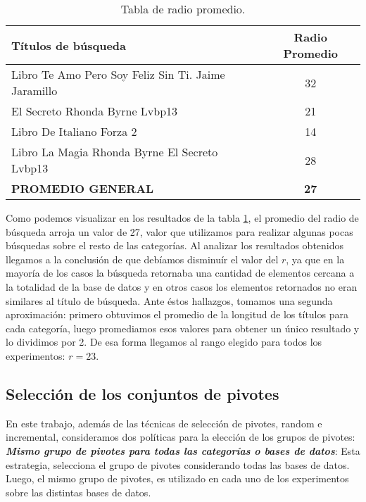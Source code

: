 \begin{table}[H]
\begin{center}
\begin{tabular}{|l|c|}
\hline 
\small T\'itulos de b\'usqueda
&
\small Radio Promedio\\
\hline \hline
\small Libro Te Amo Pero Soy Feliz Sin Ti. Jaime Jaramillo & 32  \\ \hline
\small El Secreto Rhonda Byrne Lvbp13 & 21  \\ \hline
\small Libro De Italiano Forza 2 & 14  \\ \hline
\small Libro La Magia Rhonda Byrne El Secreto Lvbp13 & 28  \\ \hline  \hline
\hspace{4cm}  \textbf{\small PROMEDIO GENERAL} & \textbf{27} \\ \hline
\end{tabular}
\caption{\small Tabla de radio promedio.}
\label{tabla:promedios-rank}
\end{center}
\end{table}

Como podemos visualizar en los resultados de la tabla \ref{tabla:promedios-rank}, el promedio del radio de b\'usqueda arroja un valor de 27, valor que utilizamos para realizar algunas pocas b\'usquedas sobre el resto de las categor\'ias. Al analizar los resultados obtenidos llegamos a la conclusi\'on de que deb\'iamos disminu\'ir el valor del $r$, ya que en la mayor\'ia de los casos la b\'usqueda retornaba una cantidad de elementos cercana a la totalidad de la base de datos y en otros casos los elementos retornados no eran similares al t\'itulo de b\'usqueda. Ante \'estos hallazgos, tomamos una segunda aproximaci\'on: primero obtuvimos el promedio de la longitud de los t\'itulos para cada categor\'ia, luego promediamos esos valores para obtener un \'unico resultado y lo dividimos por 2.  De esa forma llegamos al rango elegido para todos los experimentos: $r=23$.\\


\subsection{Selecci\'on de los conjuntos de pivotes}

En este trabajo, adem\'as de las t\'ecnicas de selecci\'on de pivotes, random e incremental, consideramos dos pol\'iticas para la elecci\'on de los grupos de pivotes:\\

\textit{\textbf{Mismo grupo de pivotes para todas las categor\'ias o bases de datos}}: Esta estrategia, selecciona el grupo de pivotes considerando todas las bases de datos. Luego, el mismo grupo de pivotes, es utilizado en cada uno de los experimentos sobre las distintas bases de datos.\\


